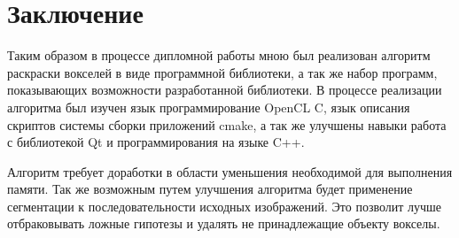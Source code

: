 \section*{Заключение}
Таким образом в процессе дипломной работы мною был реализован алгоритм раскраски вокселей в виде программной библиотеки, а так же набор программ, показывающих возможности разработанной библиотеки. В процессе реализации алгоритма был изучен язык программирование OpenCL C, язык описания скриптов системы сборки приложений cmake, а так же улучшены навыки работа с библиотекой Qt и программирования на языке C++.

Алгоритм требует доработки в области уменьшения необходимой для выполнения памяти.
Так же возможным путем улучшения алгоритма будет применение сегментации к последовательности исходных изображений. Это позволит лучше отбраковывать ложные гипотезы и удалять не принадлежащие объекту вокселы.

